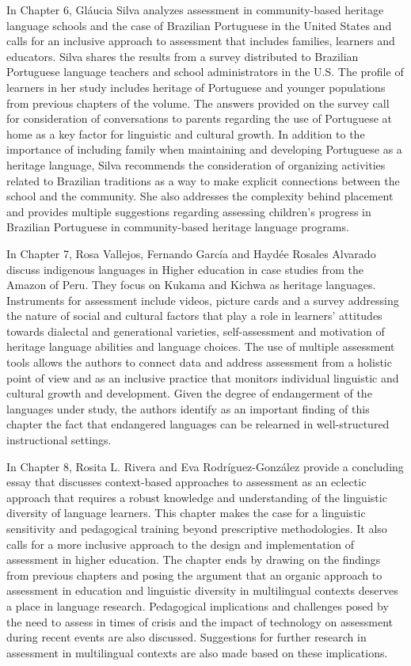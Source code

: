 \documentclass[output=paper]{langscibook}
\begin{document}
In Chapter 6, Gláucia Silva analyzes assessment in community-based heritage language schools and the case of Brazilian Portuguese in the United States and calls for an inclusive approach to assessment that includes families, learners and educators. Silva shares the results from a survey distributed to Brazilian Portuguese language teachers and school administrators in the U.S. The profile of learners in her study includes heritage of Portuguese and younger populations from previous chapters of the volume. The answers provided on the survey call for consideration of conversations to parents regarding the use of Portuguese at home as a key factor for linguistic and cultural growth. In addition to the importance of including family when maintaining and developing Portuguese as a heritage language, Silva recommends the consideration of organizing activities related to Brazilian traditions as a way to make explicit connections between the school and the community. She also addresses the complexity behind placement and provides multiple suggestions regarding assessing children’s progress in Brazilian Portuguese in community-based heritage language programs.



In Chapter 7, Rosa Vallejos, Fernando García and Haydée Rosales Alvarado discuss indigenous languages in Higher education in case studies from the Amazon of Peru. They focus on Kukama and Kichwa as heritage languages. Instruments for assessment include videos, picture cards and a survey addressing the nature of social and cultural factors that play a role in learners’ attitudes towards dialectal and generational varieties, self-assessment and motivation of heritage language abilities and language choices. The use of multiple assessment tools allows the authors to connect data and address assessment from a holistic point of view and as an inclusive practice that monitors individual linguistic and cultural growth and development. Given the degree of endangerment of the languages under study, the authors identify as an important finding of this chapter the fact that endangered languages can be relearned in well-structured instructional settings.



In Chapter 8, Rosita L. Rivera and Eva Rodríguez-González provide a concluding essay that discusses context-based approaches to assessment as an eclectic approach that requires a robust knowledge and understanding of the linguistic diversity of language learners. This chapter makes the case for a linguistic sensitivity and pedagogical training beyond prescriptive methodologies. It also calls for a more inclusive approach to the design and implementation of assessment in higher education. The chapter ends by drawing on the findings from previous chapters and posing the argument that an organic approach to assessment in education and linguistic diversity in multilingual contexts deserves a place in language research. Pedagogical implications and challenges posed by the need to assess in times of crisis and the impact of technology on assessment during recent events are also discussed.  Suggestions for further research in assessment in multilingual contexts are also made based on these implications.


\sloppy
\printbibliography[heading=subbibliography,notkeyword=this]
\end{document}
